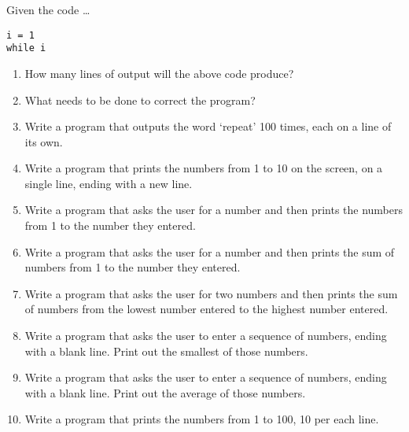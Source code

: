 Given the code \ldots
\begin{lstlisting}
i = 1
while i 
\end{lstlisting}
\begin{enumerate}
	\item How many lines of output will the above code produce?
	\item What needs to be done to correct the program?
	\item Write a program that outputs the word `repeat' 100 times,
			each on a line of its own.
	\item Write a program that prints the numbers from 1 to 10 on the
			screen, on a single line, ending with a new line.
	\item Write a program that asks the user for a number and then
			prints the numbers from 1 to the number they entered.
	\item Write a program that asks the user for a number and then
			prints the sum of numbers from 1 to the number they
			entered.
	\item Write a program that asks the user for two numbers and then
			prints the sum of numbers from the lowest number entered to the
			highest number entered.
	\item Write a program that asks the user to enter a sequence of
			numbers, ending with a blank line. Print out the smallest of those
			numbers.
	\item Write a program that asks the user to enter a sequence of
			numbers, ending with a blank line. Print out the average of those
			numbers.
	\item Write a program that prints the numbers from 1 to 100, 10
			per each line.
\end{enumerate}
